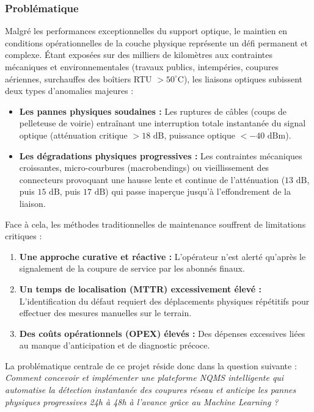 \documentclass[11pt,a4paper]{article}
\begin{document}
\subsubsection{Problématique}
Malgré les performances exceptionnelles du support optique, le maintien en conditions opérationnelles de la couche physique représente un défi permanent et complexe. Étant exposées sur des milliers de kilomètres aux contraintes mécaniques et environnementales (travaux publics, intempéries, coupures aériennes, surchauffes des boîtiers RTU $> 50^\circ\text{C}$), les liaisons optiques subissent deux types d'anomalies majeures :
\begin{itemize}
    \item \textbf{Les pannes physiques soudaines :} Les ruptures de câbles (coups de pelleteuse de voirie) entraînant une interruption totale instantanée du signal optique (atténuation critique $> 18\text{ dB}$, puissance optique $< -40\text{ dBm}$).
    \item \textbf{Les dégradations physiques progressives :} Les contraintes mécaniques croissantes, micro-courbures (macrobendings) ou vieillissement des connecteurs provoquant une hausse lente et continue de l'atténuation ($13\text{ dB}$, puis $15\text{ dB}$, puis $17\text{ dB}$) qui passe inaperçue jusqu'à l'effondrement de la liaison.
\end{itemize}

Face à cela, les méthodes traditionnelles de maintenance souffrent de limitations critiques :
\begin{enumerate}
    \item \textbf{Une approche curative et réactive :} L'opérateur n'est alerté qu'après le signalement de la coupure de service par les abonnés finaux.
    \item \textbf{Un temps de localisation (MTTR) excessivement élevé :} L'identification du défaut requiert des déplacements physiques répétitifs pour effectuer des mesures manuelles sur le terrain.
    \item \textbf{Des coûts opérationnels (OPEX) élevés :} Des dépenses excessives liées au manque d'anticipation et de diagnostic précoce.
\end{enumerate}

La problématique centrale de ce projet réside donc dans la question suivante : \textit{Comment concevoir et implémenter une plateforme NQMS intelligente qui automatise la détection instantanée des coupures réseau et anticipe les pannes physiques progressives 24h à 48h à l'avance grâce au Machine Learning ?}
\end{document}
